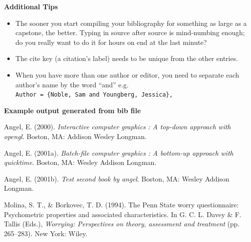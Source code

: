 \documentclass[12pt,oneside]{chicagocapstone}
\providecommand{\tightlist}{%
  \setlength{\itemsep}{0pt}\setlength{\parskip}{0pt}}
\begin{document}
\textbf{Additional Tips}
\begin{itemize}
\tightlist
\item
  The sooner you start compiling your bibliography for something as
  large as a capstone, the better. Typing in source after source is
  mind-numbing enough; do you really want to do it for hours on end at
  the last minute?
\item
  The cite key (a citation's label) needs to be unique from the other
  entries.
\item
  When you have more than one author or editor, you need to separate
  each author's name by the word ``and'' e.g.
  \texttt{Author\ =\ \{Noble,\ Sam\ and\ Youngberg,\ Jessica\},}
\end{itemize}
\textbf{Example output generated from bib file}

\hypertarget{refs}{}
\hypertarget{ref-angel2000}{}
Angel, E. (2000). \emph{Interactive computer graphics : A top-down
approach with opengl}. Boston, MA: Addison Wesley Longman.

\hypertarget{ref-angel2001}{}
Angel, E. (2001a). \emph{Batch-file computer graphics : A bottom-up
approach with quicktime}. Boston, MA: Wesley Addison Longman.

\hypertarget{ref-angel2002a}{}
Angel, E. (2001b). \emph{Test second book by angel}. Boston, MA: Wesley
Addison Longman.

\hypertarget{ref-Molina1994}{}
Molina, S. T., \& Borkovec, T. D. (1994). The Penn State worry
questionnaire: Psychometric properties and associated characteristics.
In G. C. L. Davey \& F. Tallis (Eds.), \emph{Worrying: Perspectives on
theory, assessment and treatment} (pp. 265--283). New York: Wiley.


\end{document}
